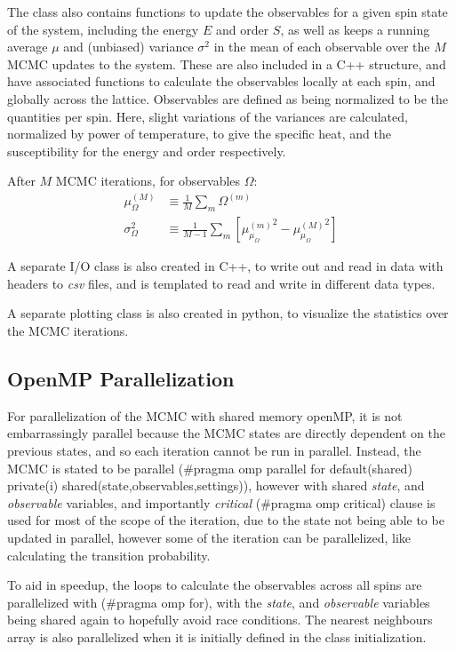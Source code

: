 \documentclass[12pt,letterpaper]{article}
\begin{document}
The class also contains functions to update the observables for a given spin state of the system, including the energy $E$ and order $S$, as well as keeps a running average $\mu$ and (unbiased) variance $\sigma^2$ in the mean of each observable over the $M$ MCMC updates to the system. These are also included in a C++ structure, and have associated functions to calculate the observables locally at each spin, and globally across the lattice. Observables are defined as being normalized to be the quantities per spin. Here, slight variations of the variances are calculated, normalized by power of temperature, to give the specific heat, and the susceptibility for the energy and order respectively.

After $M$ MCMC iterations, for observables $\Omega$:
\begin{align}
  \mu_{\Omega}^{(M)} &\equiv \frac{1}{M} \sum_m \Omega^{(m)} \\
  \sigma_{\Omega}^2 &\equiv \frac{1}{M-1} \sum_m \left[ {\mu_{\mu_{\Omega}}^{(m)}}^2 - {\mu_{\mu_{\Omega}}^{(M)}}^2 \right]
\end{align}

A separate I/O class is also created in C++, to write out and read in data with headers to \textit{csv} files, and is templated to read and write in different data types.

A separate plotting class is also created in python, to visualize the statistics over the MCMC iterations.

\subsection{OpenMP Parallelization}
For parallelization of the MCMC with shared memory openMP, it is not embarrassingly parallel because the MCMC states are directly dependent on the previous states, and so each iteration cannot be run in parallel. Instead, the MCMC is stated to be parallel (\#pragma omp parallel for default(shared) private(i) shared(state,observables,settings)), however with shared \textit{state}, and \textit{observable} variables, and importantly \textit{critical} (\#pragma omp critical) clause is used  for most of the scope of the iteration, due to the state not being able to be updated in parallel, however some of the iteration can be parallelized, like calculating the transition probability.

To aid in speedup, the loops to calculate the observables across all spins are parallelized with (\#pragma omp for), with the \textit{state}, and \textit{observable} variables being shared again to hopefully avoid race conditions. The nearest neighbours array is also parallelized when it is initially defined in the class initialization.
\end{document}
